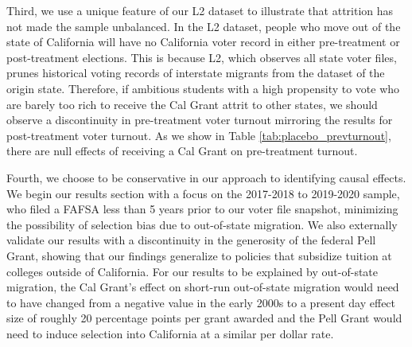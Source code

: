 \documentclass[12pt,letterpaper,oneside]{book}
\begin{document}
Third, we use a unique feature of our L2 dataset to illustrate that attrition has not made the sample unbalanced. In the L2 dataset, people who move out of the state of California will have no California voter record in either pre-treatment or post-treatment elections. This is because L2, which observes all state voter files, prunes historical voting records of interstate migrants from the dataset of the origin state. Therefore, if ambitious students with a high propensity to vote who are barely too rich to receive the Cal Grant attrit to other states, we should observe a discontinuity in pre-treatment voter turnout mirroring the results for post-treatment voter turnout. As we show in Table \ref{tab:placebo_prevturnout}, there are null effects of receiving a Cal Grant on pre-treatment turnout.

Fourth, we choose to be conservative in our approach to identifying causal effects. We begin our results section with a focus on the 2017-2018 to 2019-2020 sample, who filed a FAFSA less than 5 years prior to our voter file snapshot, minimizing the possibility of selection bias due to out-of-state migration. We also externally validate our results with a discontinuity in the generosity of the federal Pell Grant, showing that our findings generalize to policies that subsidize tuition at colleges outside of California. For our results to be explained by out-of-state migration, the Cal Grant's effect on short-run out-of-state migration would need to have changed from a negative value in the early 2000s to a present day effect size of roughly 20 percentage points per grant awarded and the Pell Grant would need to induce selection into California at a similar per dollar rate.

\clearpage
\end{document}
